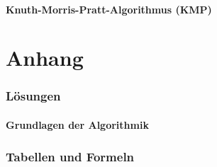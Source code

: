 \documentclass[11pt,a4paper]{scrartcl}
\begin{document}
\subsection{Knuth-Morris-Pratt-Algorithmus (KMP)}

\part{Anhang}
\section{Lösungen}
\subsection{Grundlagen der Algorithmik}
\label{a1:lsg}
\label{a2:lsg}
\label{a3:lsg}
\section{Tabellen und Formeln}
\end{document}
